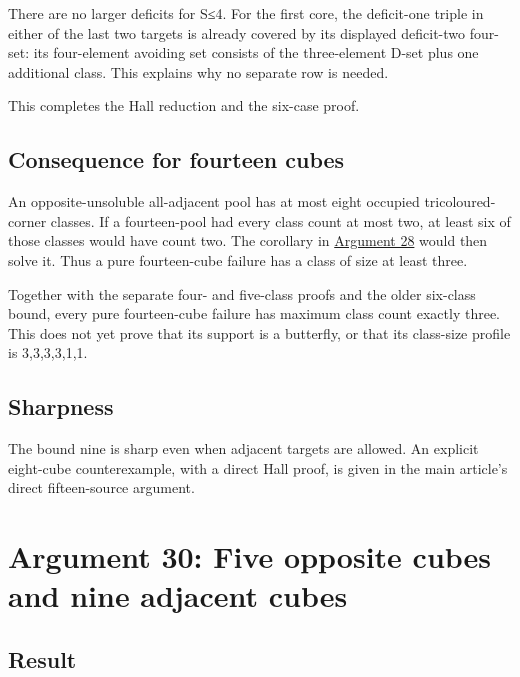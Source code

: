 \documentclass[
  10pt,
]{article}
\begin{document}
There are no larger deficits for \textbar S\textbar≤4. For the first
core, the deficit-one triple in either of the last two targets is
already covered by its displayed deficit-two four-set: its four-element
avoiding set consists of the three-element D-set plus one additional
class. This explains why no separate row is needed.

This completes the Hall reduction and the six-case proof.

\hypertarget{consequence-for-fourteen-cubes}{%
\subsection*{Consequence for fourteen
cubes}\label{consequence-for-fourteen-cubes}}

An opposite-unsoluble all-adjacent pool has at most eight occupied
tricoloured-corner classes. If a fourteen-pool had every class count at
most two, at least six of those classes would have count two. The
corollary in \protect\hyperlink{arg-28}{Argument 28} would then solve
it. Thus a pure fourteen-cube failure has a class of size at least
three.

Together with the separate four- and five-class proofs and the older
six-class bound, every pure fourteen-cube failure has maximum class
count exactly three. This does not yet prove that its support is a
butterfly, or that its class-size profile is 3,3,3,3,1,1.

\hypertarget{sharpness}{%
\subsection*{Sharpness}\label{sharpness}}

The bound nine is sharp even when adjacent targets are allowed. An
explicit eight-cube counterexample, with a direct Hall proof, is given
in the main article's direct fifteen-source argument.

\hypertarget{arg-30}{%
\section{Argument 30: Five opposite cubes and nine adjacent
cubes}\label{arg-30}}

\hypertarget{result}{%
\subsection*{Result}\label{result}}
\end{document}
